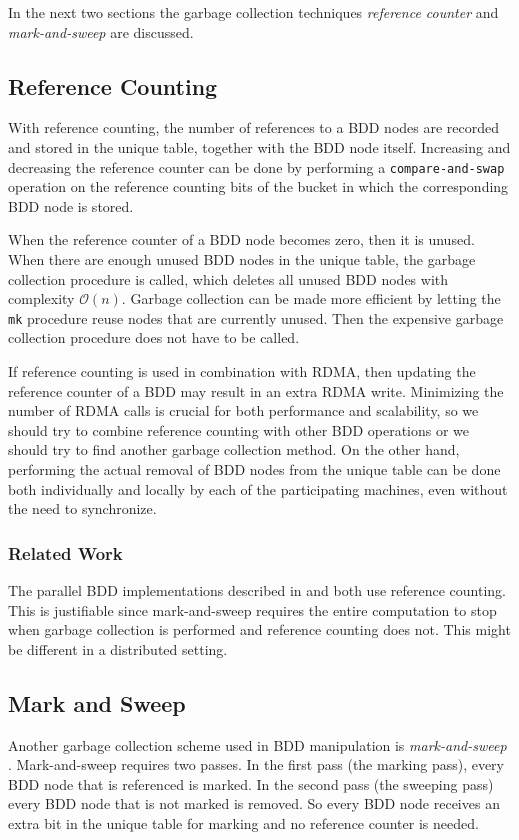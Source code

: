 In the next two sections the garbage collection techniques \emph{reference counter} and \emph{mark-and-sweep} are discussed.

\subsection{Reference Counting}
With reference counting, the number of references to a BDD nodes are recorded and stored in the unique table, together with the BDD node itself. Increasing and decreasing the reference counter can be done by performing a \texttt{compare-and-swap} operation on the reference counting bits of the bucket in which the corresponding BDD node is stored. 

When the reference counter of a BDD node becomes zero, then it is unused. When there are enough unused BDD nodes in the unique table, the garbage collection procedure is called, which deletes all unused BDD nodes with complexity $\mathcal{O}(n)$. Garbage collection can be made more efficient by letting the \texttt{mk} procedure reuse nodes that are currently unused. Then the expensive garbage collection procedure does not have to be called.

If reference counting is used in combination with RDMA, then updating the reference counter of a BDD may result in an extra RDMA write. Minimizing the number of RDMA calls is crucial for both performance and scalability, so we should try to combine reference counting with other BDD operations or we should try to find another garbage collection method. On the other hand, performing the actual removal of BDD nodes from the unique table can be done both individually and locally by each of the participating machines, even without the need to synchronize. 

\subsubsection{Related Work}
The parallel BDD implementations described in \cite{dijk2012parallelization} and \cite{sylvan_multicore_bdd} both use reference counting. This is justifiable since mark-and-sweep requires the entire computation to stop when garbage collection is performed and reference counting does not. This might be different in a distributed setting. 

\subsection{Mark and Sweep}
Another garbage collection scheme used in BDD manipulation is \emph{mark-and-sweep} \cite{mccarthy1960recursive}. Mark-and-sweep requires two passes. In the first pass (the marking pass), every BDD node that is referenced is marked. In the second pass (the sweeping pass) every BDD node that is not marked is removed. So every BDD node receives an extra bit in the unique table for marking and no reference counter is needed.

